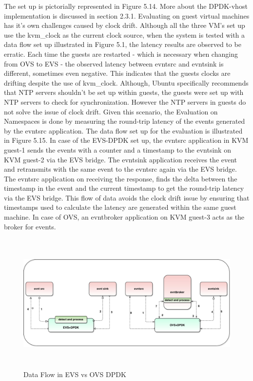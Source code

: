 The set up is pictorially represented in Figure 5.14. More about the DPDK-vhost implementation is discussed in section 2.3.1. Evaluating on guest virtual machines has it's own challenges caused by clock drift. Although all the three VM's set up use the kvm_clock as the current clock source, when the system is tested with a data flow set up illustrated in Figure 5.1, the latency results are observed to be erratic. Each time the guests are restarted - which is necessary when changing from OVS to EVS - the observed latency between evntsrc and evntsink is different, sometimes even negative. This indicates that the guests clocks are drifting despite the use of kvm_clock. Although, Ubuntu specifically recommends that NTP servers shouldn't be set up within guests, the guests were set up with NTP servers to check for synchronization. However the NTP servers in guests do not solve the issue of clock drift. Given this scenario, the Evaluation on Namespaces is done by measuring the round-trip latency of the events generated by the evntsrc application. The data flow set up for the evaluation is illustrated in Figure 5.15. In case of the EVS-DPDK set up, the evntsrc application  in KVM guest-1 sends the events with a counter and a timestamp to the evntsink on KVM guest-2 via the EVS bridge. The evntsink application receives the event and retransmits with the same event to the evntsrc again via the EVS bridge. The evntsrc application on receiving the response, finds the delta between the timestamp in the event and the current timestamp to get the round-trip latency via the EVS bridge. This flow of data avoids the clock drift issue by ensuring that timestamps used to calculate the latency are generated within the same guest machine. In case of OVS, an evntbroker application on KVM guest-3 acts as the broker for events.



 \begin{figure}[H]
	\centering
	\caption{Data Flow in EVS vs OVS DPDK}
	\includegraphics[height=7cm]{evsovsdpdk.pdf}
\end{figure}


